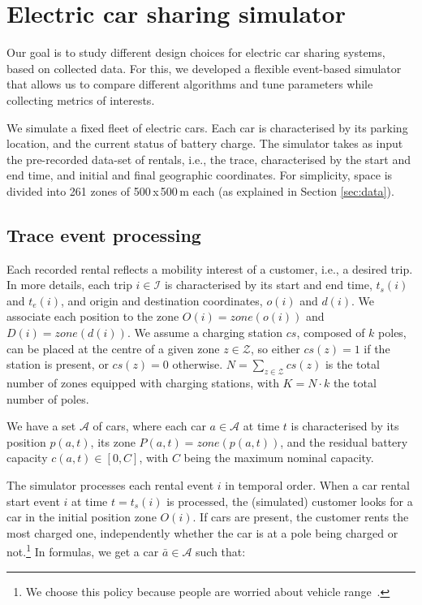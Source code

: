 \section{Electric car sharing simulator}
\label{sec:Modelling}

Our goal is to study different design choices for electric car sharing systems, based on collected data. For this, we developed a flexible event-based simulator that allows us to compare different algorithms and tune  parameters while collecting metrics of interests.


We simulate a fixed fleet of electric cars. Each car is characterised by its parking location, and the current status of battery charge. 
The simulator takes as input the pre-recorded data-set of rentals, i.e., the trace, characterised by the start and end time, and initial and final geographic coordinates. For simplicity, space is divided into 261 zones of 500\,x\,500\,m each (as explained in Section \ref{sec:data}). 


\subsection{Trace event processing}

Each recorded rental reflects a mobility interest of a customer, i.e., a desired trip.
In more details, each trip $i \in \mathcal{I}$  is characterised by its start and end time, $t_{s}(i)$ and $t_{e}(i)$, and origin and destination coordinates, $o(i)$ and $d(i)$. We associate each position to the zone $O(i)=zone(o(i))$ and $D(i)=zone(d(i))$. We assume a charging station $cs$, composed of $k$ poles, can be placed at the centre of a given zone $z\in \mathcal{Z}$, so either $cs(z)=1$ if the station is present, or $cs(z)=0$ otherwise. $N=\sum_{z\in \mathcal{Z}}cs(z)$ is the total number of zones equipped with charging stations, with $K=N\cdot k$ the total number of poles.

We have a set $\mathcal{A}$ of cars, where each car $a\in \mathcal{A}$ at time $t$ is characterised by its position $p(a,t)$, its zone $P(a,t)=zone(p(a,t))$, and the residual battery capacity $c(a,t)\in[0,C]$, with $C$ being the maximum nominal capacity.

The simulator processes each rental event $i$ in temporal order. 
When a car rental start event $i$ at time $t=t_{s}(i)$ is processed, the (simulated) customer looks for a car in the initial position zone $O(i)$. If cars are present, the customer rents the most charged one, independently whether the car is at a pole being charged or not.\footnote{We choose this policy because people are worried about vehicle range~\cite{RangeAnxiety}.}
In formulas, we get a car $\bar{a} \in \mathcal{A}$ such that:

